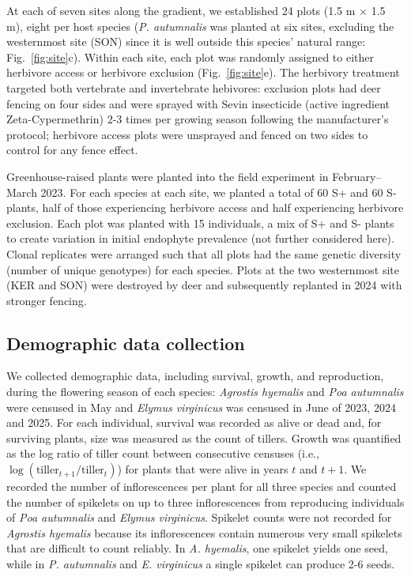 \documentclass[12pt]{article}\usepackage[]{graphicx}\usepackage[dvipsnames]{xcolor}
\begin{document}
At each of seven sites along the gradient, we established 24 plots (1.5 m $\times$ 1.5 m), eight per host species (\textit{P. autumnalis} was planted at six sites, excluding the westernmost site (SON) since it is well outside this species' natural range: Fig.~\ref{fig:site}c). 
Within each site, each plot was randomly assigned to either herbivore access or herbivore exclusion (Fig.~\ref{fig:site}e). 
The herbivory treatment targeted both vertebrate and invertebrate hebivores: exclusion plots had deer fencing on four sides and were sprayed with Sevin insecticide (active ingredient Zeta-Cypermethrin) 2-3 times per growing season following the manufacturer's protocol; herbivore access plots were unsprayed and fenced on two sides to control for any fence effect.

Greenhouse-raised plants were planted into the field experiment in February--March 2023.
For each species at each site, we planted a total of 60 S+ and 60 S- plants, half of those experiencing herbivore access and half experiencing herbivore exclusion. 
Each plot was planted with 15 individuals, a mix of S+ and S- plants to create variation in initial endophyte prevalence (not further considered here). 
Clonal replicates were arranged such that all plots had the same genetic diversity (number of unique genotypes) for each species.  
Plots at the two westernmost site (KER and SON) were destroyed by deer and subsequently replanted in 2024 with stronger fencing. 

\subsection*{Demographic data collection}
We collected demographic data, including survival, growth, and reproduction, during the flowering season of each species: \emph{Agrostis hyemalis} and \emph{Poa autumnalis} were censused in May and \emph{Elymus virginicus} was censused in June of 2023, 2024 and 2025.
For each individual, survival was recorded as alive or dead and, for surviving plants, size was measured as the count of tillers.  
Growth was quantified as the log ratio of tiller count between consecutive censuses (i.e., $\log(\text{tiller}_{t+1}/\text{tiller}_{t})$) for plants that were alive in years $t$ and $t+1$.
We recorded the number of inflorescences per plant for all three species and counted the number of spikelets on up to three inflorescences from reproducing individuals of \emph{Poa autumnalis} and \emph{Elymus virginicus}. 
Spikelet counts were not recorded for \emph{Agrostis hyemalis} because its inflorescences contain numerous very small spikelets that are difficult to count reliably.
In \emph{A. hyemalis}, one spikelet yields one seed, while in \emph{P. autumnalis} and \emph{E. virginicus} a single spikelet can produce 2-6 seeds. 
\end{document}

